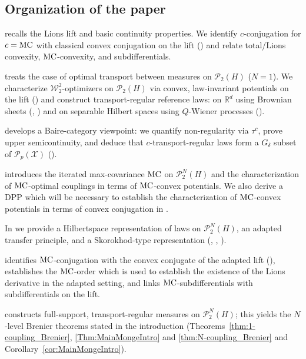 \documentclass[a4paper]{amsart}
\numberwithin{theorem}{section}
\theoremstyle{definition}
\newcommand{\R}{\mathbb{R}}
\newcommand{\X}{\mathcal{X}}
\newcommand{\W}{\mathcal{W}}
\newcommand{\Pc}{\mathcal P}
\newcommand{\mc}{\textup{MC}}
\begin{document}
\subsection{Organization of the paper}

 recalls the Lions lift and basic continuity properties. We identify $c$-conjugation for $c=\mc$ with classical convex conjugation on the lift () and relate total/Lions convexity, $\mc$-convexity, and subdifferentials.

 treats the case of optimal transport between measures on $\Pc_2(H)$ ($N=1$). We characterize $\W_2^2$-optimizers on $\Pc_2(H)$ via convex, law-invariant potentials on the lift () and construct transport-regular reference laws: on $\R^d$ using Brownian sheets (, ) and on separable Hilbert spaces using $Q$-Wiener processes ().

 develops a Baire-category viewpoint: we quantify non-regularity via $\tau^c$, prove upper semicontinuity, and deduce that $c$-transport-regular laws form a $G_\delta$ subset of $\Pc_p(\X)$ ().

 introduces the iterated max-covariance $\mc$ on $\Pc_2^{N}(H)$ and the characterization of $\mc$-optimal couplings in terms of $\mc$-convex potentials. We also derive a DPP which will be necessary to establish the characterization of $\mc$-convex potentials in terms of convex conjugation in .

In  we provide a Hilbertspace  representation of laws on $\Pc_2^{N}(H)$, an adapted transfer principle, and a Skorokhod-type representation (, , ).

 identifies $\mc$-conjugation with the convex conjugate of the adapted lift (), establishes the $\mc$-order which is used to establish the existence of the Lions derivative in the adapted setting, and links $\mc$-subdifferentials with subdifferentials on the lift.

 constructs full-support, transport-regular measures on $\Pc_2^{N}(H)$; this yields the $N$-level Brenier theorems stated in the introduction (Theorems~\ref{thm:1-coupling_Brenier}, \ref{Thm:MainMongeIntro} and \ref{thm:N-coupling_Brenier} and Corollary~\ref{cor:MainMongeIntro}).
\end{document}
